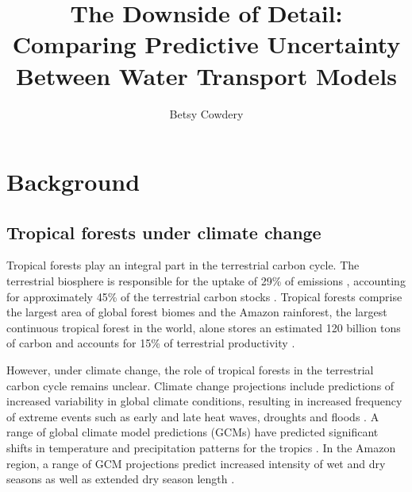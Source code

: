 \documentclass[10pt]{article}
\begin{document}
\title{The Downside of Detail:\\
Comparing Predictive Uncertainty Between Water Transport Models}
    
\author[1,2]{Betsy Cowdery}


\maketitle


\section*{Background}

\subsection*{Tropical forests under climate change}
Tropical forests play an integral part in the terrestrial carbon cycle. The terrestrial biosphere is responsible for the uptake of 29\% of  emissions \citep{friedlingstein_2019}, accounting for approximately 45\% of the terrestrial carbon stocks \citep{bonan_2008}. Tropical forests comprise the largest area of global forest biomes \citep{pan_2011} and the Amazon rainforest, the largest continuous tropical forest in the world, \citep{malhi_2008} alone stores an estimated 120 billion tons of carbon \citep{phillips_2009} and accounts for 15\% of terrestrial productivity \citep{field_1998}.

However, under climate change, the role of tropical forests in the terrestrial carbon cycle remains unclear. Climate change projections include predictions of increased variability in global climate conditions, resulting in increased frequency of extreme events such as early and late heat waves, droughts and floods \citep{ipcc_2015}.  A range of global climate model predictions (GCMs) have predicted significant shifts in temperature and precipitation patterns for the tropics \citep{maloney_2014}. In the Amazon region, a range of GCM projections predict increased intensity of wet and dry seasons \citep{lintner_2012} as well as extended dry season length \citep{malhi_2009, malhi_2008}.
\end{document}
